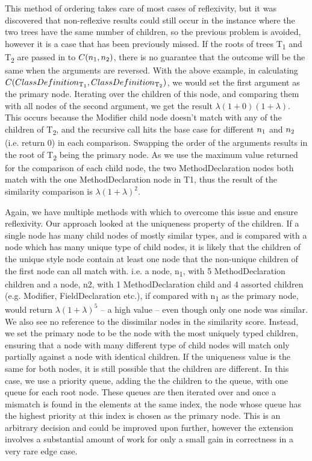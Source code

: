 This method of ordering takes care of most cases of reflexivity, but it
was discovered that non-reflexive results could still occur in the instance where
 the two trees have the same number of children, so the
previous problem is avoided, however it is a case that has been previously
missed. If the roots of trees T\textsubscript{1} and T\textsubscript{2} are passed in
 to $C(n\textsubscript{1},n\textsubscript{2})$, there
is no guarantee that the outcome will be the same when the arguments are reversed. With the above example, in calculating $C(ClassDefinition\textsubscript{T\textsubscript{1}},ClassDefinition\textsubscript{T\textsubscript{2}})$, we would set the first argument as the primary node. Iterating over the
children of this node, and comparing them with all nodes of the second argument, 
we get the result $\lambda(1 + 0)(1 + \lambda)$. This occurs because the Modifier
child node doesn’t match with any of the children of T\textsubscript{2}, and the recursive
call hits the base case for different $n\textsubscript{1}$ and $n\textsubscript{2}$ (i.e. return 0) in each 
comparison. Swapping the order of the arguments results in the root of T\textsubscript{2} being the
primary node. As we use the maximum value returned for the comparison
of each child node, the two MethodDeclaration nodes both match with the one MethodDeclaration node in T1, thus the result of the similarity comparison is $\lambda(1 + \lambda)^2$.

Again, we have multiple methods with which to overcome this issue and ensure reflexivity. Our approach looked at the uniqueness property of the children. If a single node has many child nodes of mostly similar types, and is compared with a node which has many unique type of child nodes, it is likely that the children of the unique style node contain at least one node that the non-unique children of the first node can all match with. i.e. a node, n\textsubscript{1}, with 5 MethodDeclaration children and a node, n2, with 1 MethodDeclaration child and 4 assorted children (e.g. Modifier, FieldDeclaration etc.), if compared with n\textsubscript{1} as the primary node, would return $\lambda(1 + \lambda)^5$ -- a high value -- even though only one node was similar. We also see no reference to the dissimilar nodes in the similarity score. Instead, we set the primary node to be the node with the most uniquely typed children, ensuring that a node with many different type of child nodes will match only partially against a node with identical children.
If the uniqueness value is the same for both nodes, it is still possible that the children are different. In this case, we use a priority queue, adding the the children to the queue, with one queue for each root node. These queues are then iterated over and once a mismatch is found in the elements at the same index, the node whose queue has the highest priority at this index is chosen as the primary node. This is an arbitrary decision and could be improved upon further, however
the extension involves a substantial amount of work for only a small gain in correctness in a
very rare edge case.

